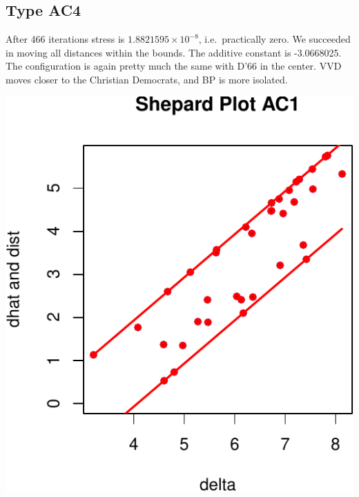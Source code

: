 \documentclass[
  12pt,
]{article}
\begin{document}
\subsection{Type AC4}\label{type-ac4-1}

After 466 iterations stress is \ensuremath{1.8821595\times 10^{-8}}, i.e.~practically zero. We succeeded in moving all distances within the bounds. The additive constant is -3.0668025. The configuration
is again pretty much the same with D'66 in the center. VVD moves closer to the Christian
Democrats, and BP is more isolated.

\begin{center}\includegraphics{smacofAC_files/figure-latex/gruijterh11-1} \end{center}
\end{document}
